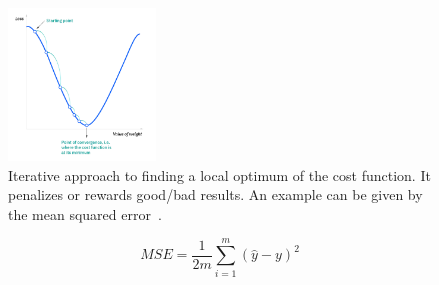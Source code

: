 \begin{frame}{\insertsubsection}
    \begin{figure}
        \centering
        \includegraphics[width=0.35\textwidth]{media/ICLH_Diagram_Batch_01_04-GradientDescent-WHITEBG.png}
        \caption{Iterative approach to finding a local optimum of the cost function.
            It penalizes or rewards good/bad results. An example can be given by the mean squared error~\cite{IBM2020}.}
    \end{figure}
    \begin{equation}
        MSE = \frac{1}{2m}\sum\limits_{i=1}^m(\hat{y}-y)^2
    \end{equation}
\end{frame}